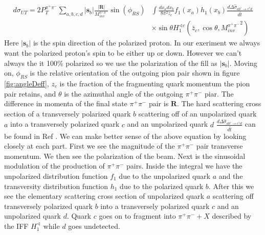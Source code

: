 \documentclass[abstract = on,listof=totoc, bibliography=totoc]{scrreprt}
\newcommand{\phirs}{\phi_{RS}}
\newcommand{\ptpair}{P_{T}^{\pi^+\pi^-}}
\newcommand{\mpair}{M_{inv}^{\pi^+\pi^-}}
\newcommand{\pip}{\pi^+}
\newcommand{\pim}{\pi^-}
\newcommand{\pair}{$\pip\pim$ }
\begin{document}
\begin{align}
\label{eq:crossSecUT_3}
d\sigma_{UT} = 2\ptpair \sum_{a,b,c,d} |\boldsymbol{s}_b| \frac{|\boldsymbol{R}|}{\mpair}\sin(\phirs) & \int \frac{dx_a dx_b}{8\pi^2 z_c} f_1(x_a) h_1(x_b) \frac{d\Delta\hat{\sigma}_{a b^\uparrow \rightarrow c^\uparrow d}}{d\hat{t}} \nonumber \\ 
&\times \sin\theta H_1^{\sphericalangle c} \left(\bar{z}_c,\cos\theta, {\mpair}^2\right) 
\end{align}
%
Here $|\bm{s}_b|$ is the spin direction of the polarized proton. In our exeriment we always want the polarized proton's spin to be either up or down. However we can't always the it 100\% polarized so we use the polarization of the fill as $|\bm{s}_b|$. Moving on, $\phirs$ is the relative orientation of the outgoing pion pair shown in figure \ref{fig:angleDeff}, $z_c$ is the fraction of the fragmenting quark momentum the pion pair retains, and $\theta$ is the azimuthal angle of the outgoing \pair piar. The difference in momenta of the final state \pair pair is $\boldsymbol{R}$. The hard scattering cross section of a transversely polarized quark $b$ scattering off of an unpolarized quark $a$ into a transversely polarized quark $c$ and an unpolarized quark $d$ $\frac{d\Delta\hat{\sigma}_{a b^\uparrow \rightarrow c^\uparrow d}}{d\hat{t}}$ can be found in Ref \cite{bacchettaRedici2}.
We can make better sense of the above equation by looking closely at each part. First we see the magnitude of the \pair pair transverse momentum. We then see the polarization of the beam. Next is the sinusoidal modulation of the production of \pair pairs. Inside the integral we have the unpolarized distribution function $f_1$ due to the unpolarized  quark $a$ and the transversity distribution function $h_1$ due to the polarized quark $b$. After this we see the elementary scattering cross section of unpolarized quark $a$ scattering off transversely polarized quark $b$ into a transversely polarized quark $c$ and an unpolarized quark $d$. Quark $c$ goes on to fragment into $\pip\pim + X$ described by the IFF $H_1^{\sphericalangle}$ while $d$ goes undetected. 
\end{document}
